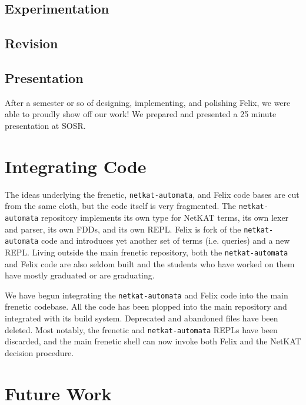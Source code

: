 \documentclass{hw}
\newcommand{\netauto}{\texttt{netkat-automata}}
\begin{document}
\subsection{Experimentation}

\subsection{Revision}

\subsection{Presentation}
After a semester or so of designing, implementing, and polishing Felix, we were
able to proudly show off our work! We prepared and presented a 25 minute
presentation at SOSR.

\section{Integrating Code}
The ideas underlying the frenetic, \netauto{}, and Felix code bases are cut
from the same cloth, but the code itself is very fragmented. The \netauto{}
repository implements its own type for NetKAT terms, its own lexer and parser,
its own FDDs, and its own REPL. Felix is fork of the \netauto{} code and
introduces yet another set of terms (i.e. queries) and a new REPL. Living
outside the main frenetic repository, both the \netauto{} and Felix code are
also seldom built and the students who have worked on them have mostly
graduated or are graduating.

We have begun integrating the \netauto{} and Felix code into the main frenetic
codebase. All the code has been plopped into the main repository and integrated
with its build system. Deprecated and abandoned files have been deleted. Most
notably, the frenetic and \netauto{} REPLs have been discarded, and the main
frenetic shell can now invoke both Felix and the NetKAT decision procedure.

\section{Future Work}
\end{document}
